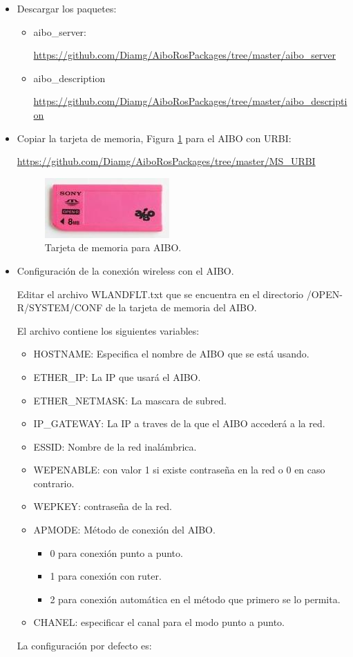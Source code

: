 \documentclass[12pt,a4paper,final,twoside]{book}
\begin{document}
\begin{itemize}
\item Descargar los paquetes:
\begin{itemize}
\item aibo{\_}server:

\url{https://github.com/Diamg/AiboRosPackages/tree/master/aibo_server}
\item aibo{\_}description

\url{https://github.com/Diamg/AiboRosPackages/tree/master/aibo_description}
\end{itemize}
\item Copiar la tarjeta de memoria, Figura \ref{fig:aiboMS} para el AIBO con URBI:

\url{https://github.com/Diamg/AiboRosPackages/tree/master/MS_URBI}
\begin{figure}[H]
	\centering
    \includegraphics[scale=0.5]{images/MS.jpg}
	 \caption{Tarjeta de memoria para AIBO.}
  \label{fig:aiboMS}
\end{figure}

\item Configuración de la conexión wireless con el AIBO.

Editar el archivo WLANDFLT.txt que se encuentra en el directorio /OPEN-R/SYSTEM/CONF de la tarjeta de memoria del AIBO.

El archivo contiene los siguientes variables:
\begin{itemize}
\item HOSTNAME: Especifica el nombre de AIBO que se está usando.
\item ETHER{\_}IP: La IP que usará el AIBO.
\item ETHER{\_}NETMASK: La mascara de subred.
\item IP{\_}GATEWAY: La IP a traves de la que el AIBO accederá a la red.
\item ESSID: Nombre de la red inalámbrica.
\item WEPENABLE: con valor 1 si existe contraseña en la red o 0 en caso contrario.
\item WEPKEY: contraseña de la red.
\item APMODE: Método de conexión del AIBO.
\begin{itemize}
\item 0 para conexión punto a punto.
\item 1 para conexión con ruter.
\item 2 para conexión automática en el método que primero se lo permita.
\end{itemize}
\item CHANEL: especificar el canal para el modo punto a punto.
\end{itemize}
La configuración por defecto es:


\end{itemize}
\end{document}
